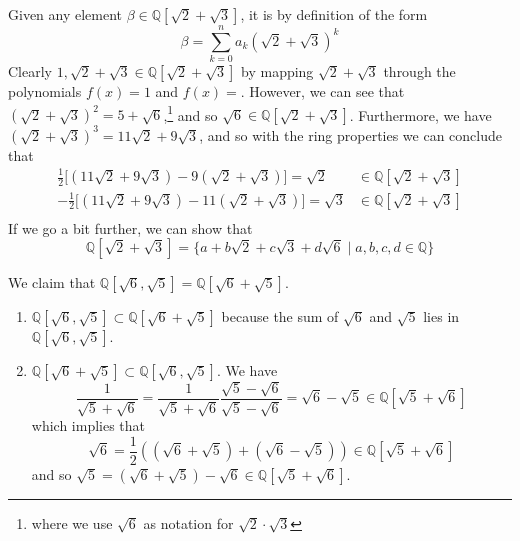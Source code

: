   \begin{example}
    \label{ex:radical-extensions-of-sqrt2sqrt3}
    Given any element $\beta \in \mathbb{Q}[\sqrt{2} + \sqrt{3}]$, it is by definition of the form 
    \begin{equation}
      \beta = \sum_{k=0}^n a_k (\sqrt{2} + \sqrt{3})^k 
    \end{equation} 
    Clearly $1, \sqrt{2} + \sqrt{3} \in \mathbb{Q}[\sqrt{2} + \sqrt{3}]$ by mapping $\sqrt{2} + \sqrt{3}$ through the polynomials $f(x) = 1$ and $f(x) = $. However, we can see that $(\sqrt{2} + \sqrt{3})^2 = 5 + \sqrt{6}$,\footnote{where we use $\sqrt{6}$ as notation for $\sqrt{2} \cdot \sqrt{3}$} and so $\sqrt{6} \in \mathbb{Q}[\sqrt{2} + \sqrt{3}]$. Furthermore, we have $(\sqrt{2} + \sqrt{3})^3 = 11 \sqrt{2} + 9 \sqrt{3}$, and so with the ring properties we can conclude that 
    \begin{align}
      \frac{1}{2} \big[ (11 \sqrt{2} + 9 \sqrt{3}) - 9 (\sqrt{2} + \sqrt{3})\big] = \sqrt{2} & \in \mathbb{Q}[\sqrt{2} + \sqrt{3}] \\
      -\frac{1}{2} \big[ (11 \sqrt{2} + 9 \sqrt{3}) - 11 (\sqrt{2} + \sqrt{3})\big] = \sqrt{3} & \in \mathbb{Q}[\sqrt{2} + \sqrt{3}] \\
    \end{align} 
    If we go a bit further, we can show that 
    \begin{equation}
      \mathbb{Q}[\sqrt{2} + \sqrt{3}] = \{a + b \sqrt{2} + c \sqrt{3} + d\sqrt{6} \mid a, b, c, d \in \mathbb{Q} \}
    \end{equation}
  \end{example}

  \begin{example}
    \label{ex:showing-two-extensions-are-equal}
    We claim that $\mathbb{Q}[\sqrt{6}, \sqrt{5}] = \mathbb{Q}[\sqrt{6} + \sqrt{5}]$. 
    \begin{enumerate}
      \item $\mathbb{Q}[\sqrt{6}, \sqrt{5}] \subset \mathbb{Q}[\sqrt{6} + \sqrt{5}]$ because the sum of $\sqrt{6}$ and $\sqrt{5}$ lies in $\mathbb{Q}[\sqrt{6}, \sqrt{5}]$. 
      \item $\mathbb{Q}[\sqrt{6} + \sqrt{5}] \subset \mathbb{Q}[\sqrt{6}, \sqrt{5}]$. We have 
        \begin{equation}
          \frac{1}{\sqrt{5} + \sqrt{6}} = \frac{1}{\sqrt{5} + \sqrt{6}} \frac{\sqrt{5} - \sqrt{6}}{\sqrt{5} - \sqrt{6}} = \sqrt{6} - \sqrt{5} \in \mathbb{Q}[\sqrt{5} + \sqrt{6}] 
        \end{equation}
        which implies that 
        \begin{equation}
          \sqrt{6} = \frac{1}{2} ((\sqrt{6} + \sqrt{5}) + (\sqrt{6} - \sqrt{5})) \in \mathbb{Q}[\sqrt{5} + \sqrt{6}] 
        \end{equation}
        and so $\sqrt{5} = (\sqrt{6} + \sqrt{5}) - \sqrt{6} \in \mathbb{Q}[\sqrt{5} + \sqrt{6}]$. 
    \end{enumerate}
  \end{example}

